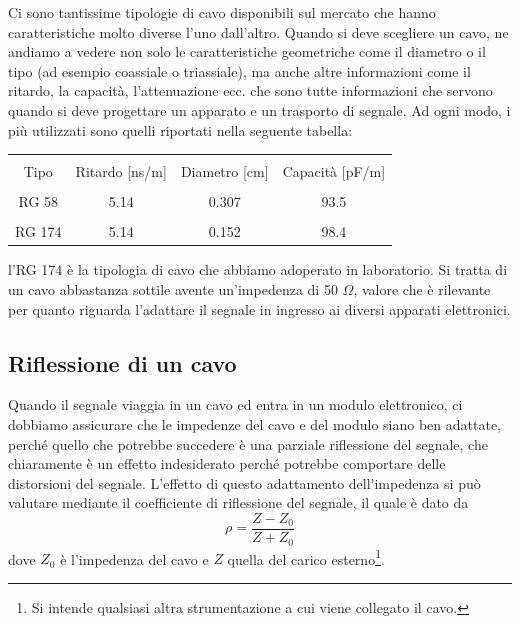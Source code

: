 Ci sono tantissime tipologie di cavo disponibili sul mercato che hanno caratteristiche molto diverse l'uno dall'altro. Quando si deve scegliere un cavo, ne andiamo a vedere non solo le caratteristiche geometriche come il diametro o il tipo (ad esempio coassiale o triassiale), ma anche altre informazioni come il ritardo, la capacità, l'attenuazione ecc. che sono tutte informazioni che servono quando si deve progettare un apparato e un trasporto di segnale. Ad ogni modo, i più utilizzati sono quelli riportati nella seguente tabella:

\begin{table}[H]
   \centering
   \begin{tabular}{|c|c|c|c|}
      \hline
      &&&\\[-0.3cm]
      Tipo & Ritardo [ns/m] & Diametro [cm] & Capacità [pF/m]\\[0.2cm]
      \hline
      &&&\\[-0.3cm]
      RG 58 & 5.14 & 0.307 & 93.5\\[0.2cm]
      \hline
      &&&\\[-0.3cm]
      RG 174 & 5.14 & 0.152 & 98.4\\[0.2cm]
      \hline
   \end{tabular}
\end{table}

l'RG 174 è la tipologia di cavo che abbiamo adoperato in laboratorio. Si tratta di un cavo abbastanza sottile avente un'impedenza di 50 $\Omega$, valore che è rilevante per quanto riguarda l'adattare il segnale in ingresso ai diversi apparati elettronici.

\subsection{Riflessione di un cavo}
Quando il segnale viaggia in un cavo ed entra in un modulo elettronico, ci dobbiamo assicurare che le impedenze del cavo e del modulo siano ben adattate, perché quello che potrebbe succedere è una parziale riflessione del segnale, che chiaramente è un effetto indesiderato perché potrebbe comportare delle distorsioni del segnale. L'effetto di questo adattamento dell'impedenza si può valutare mediante il coefficiente di riflessione del segnale, il quale è dato da
\begin{equation*}
   \rho=\frac{Z - Z_0}{Z + Z_0}
\end{equation*}
dove $Z_0$ è l'impedenza del cavo e $Z$ quella del carico esterno\footnote{Si intende qualsiasi altra strumentazione a cui viene collegato il cavo.}.

